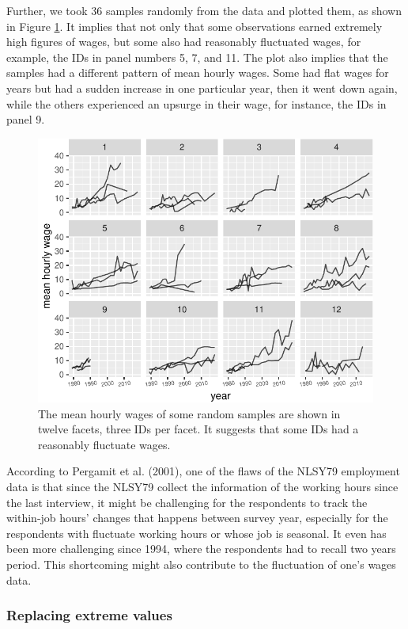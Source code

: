 \documentclass{article}
\begin{document}
Further, we took 36 samples randomly from the data and plotted them, as shown in Figure \ref{fig:sample-plot}. It implies that not only that some observations earned extremely high figures of wages, but some also had reasonably fluctuated wages, for example, the IDs in panel numbers 5, 7, and 11. The plot also implies that the samples had a different pattern of mean hourly wages. Some had flat wages for years but had a sudden increase in one particular year, then it went down again, while the others experienced an upsurge in their wage, for instance, the IDs in panel 9.

\begin{figure}
\centering
\includegraphics{figures/sample-plot-1.pdf}
\caption{\label{fig:sample-plot}The mean hourly wages of some random samples are shown in twelve facets, three IDs per facet. It suggests that some IDs had a reasonably fluctuate wages.}
\end{figure}

According to Pergamit et al. (2001), one of the flaws of the NLSY79 employment data is that since the NLSY79 collect the information of the working hours since the last interview, it might be challenging for the respondents to track the within-job hours' changes that happens between survey year, especially for the respondents with fluctuate working hours or whose job is seasonal. It even has been more challenging since 1994, where the respondents had to recall two years period. This shortcoming might also contribute to the fluctuation of one's wages data.

\hypertarget{replacing-extreme-values}{%
\subsubsection{Replacing extreme values}\label{replacing-extreme-values}}
\end{document}
